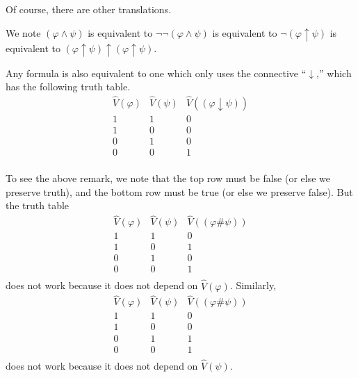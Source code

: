 Of course, there are other translations.
\begin{example}
	We note $(\varphi\land\psi)$ is equivalent to $\lnot\lnot(\varphi\land\psi)$ is equivalent to $\lnot(\varphi\uparrow\psi)$ is equivalent to $(\varphi\uparrow\psi)\uparrow(\varphi\uparrow\psi)$.
\end{example}
\begin{remark}
	Any formula is also equivalent to one which only uses the connective ``$\downarrow$,'' which has the following truth table.
	\[\begin{array}{c|c||c}
		\hat V(\varphi) & \hat V(\psi) & \hat V((\varphi\downarrow\psi)) \\
		\hline
		1 & 1 & 0 \\
		1 & 0 & 0 \\
		0 & 1 & 0 \\
		0 & 0 & 1 \\
	\end{array}\]
\end{remark}
To see the above remark, we note that the top row must be false (or else we preserve truth), and the bottom row must be true (or else we preserve false). But the truth table
\[\begin{array}{c|c||c}
	\hat V(\varphi) & \hat V(\psi) & \hat V((\varphi\#\psi)) \\
	\hline
	1 & 1 & 0 \\
	1 & 0 & 1 \\
	0 & 1 & 0 \\
	0 & 0 & 1 \\
\end{array}\]
does not work because it does not depend on $\hat V(\varphi)$. Similarly,
\[\begin{array}{c|c||c}
	\hat V(\varphi) & \hat V(\psi) & \hat V((\varphi\#\psi)) \\
	\hline
	1 & 1 & 0 \\
	1 & 0 & 0 \\
	0 & 1 & 1 \\
	0 & 0 & 1 \\
\end{array}\]
does not work because it does not depend on $\hat V(\psi)$.


